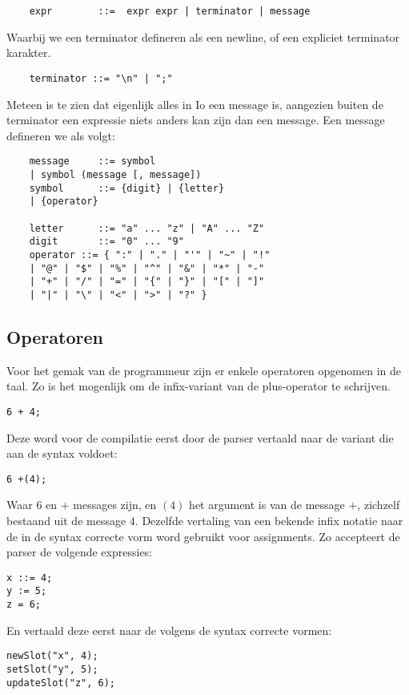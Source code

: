 \documentclass[12pt]{article}
\begin{document}
\begin{lstlisting}
	expr		::=  expr expr | terminator | message 
	\end{lstlisting}
	
Waarbij we een terminator defineren als een newline, of een expliciet terminator karakter.
\begin{lstlisting}
	terminator ::= "\n" | ";"
\end{lstlisting}
Meteen is te zien dat eigenlijk alles in Io een message is, aangezien buiten de terminator een expressie niets anders kan zijn dan een message. Een message defineren we als volgt:

\begin{lstlisting}
	message		::= symbol 
	| symbol (message [, message])
	symbol		::= {digit} | {letter} 
	| {operator}
	
	letter 		::= "a" ... "z" | "A" ... "Z"
	digit 		::= "0" ... "9"
	operator ::= { ":" | "." | "'" | "~" | "!" 
	| "@" | "$" | "%" | "^" | "&" | "*" | "-" 
	| "+" | "/"	| "=" | "{" | "}" | "[" | "]" 
	| "|" | "\" | "<" | ">" | "?" }
\end{lstlisting}

\subsection{Operatoren}
Voor het gemak van de programmeur zijn er enkele operatoren opgenomen in de taal. Zo is het mogenlijk om de infix-variant van de plus-operator te schrijven.
\begin{lstlisting}[frame=single]
6 + 4;
\end{lstlisting}
Deze word voor de compilatie eerst door de parser vertaald naar de variant die aan de syntax voldoet:
\begin{lstlisting}[frame=single]
6 +(4);
\end{lstlisting}
Waar \(6\) en \(+\) messages zijn, en \( (4) \) het argument is van de message \(+\), zichzelf bestaand uit de message \(4\). Dezelfde vertaling van een bekende infix notatie naar de in de syntax correcte vorm word gebruikt voor assignments. Zo accepteert de parser de volgende expressies:
\begin{lstlisting}[frame=single]
x ::= 4;
y := 5;
z = 6;
\end{lstlisting}
En vertaald deze eerst naar de volgens de syntax correcte vormen:
\begin{lstlisting}[frame=single]
newSlot("x", 4);
setSlot("y", 5);
updateSlot("z", 6);
\end{lstlisting}
\end{document}
